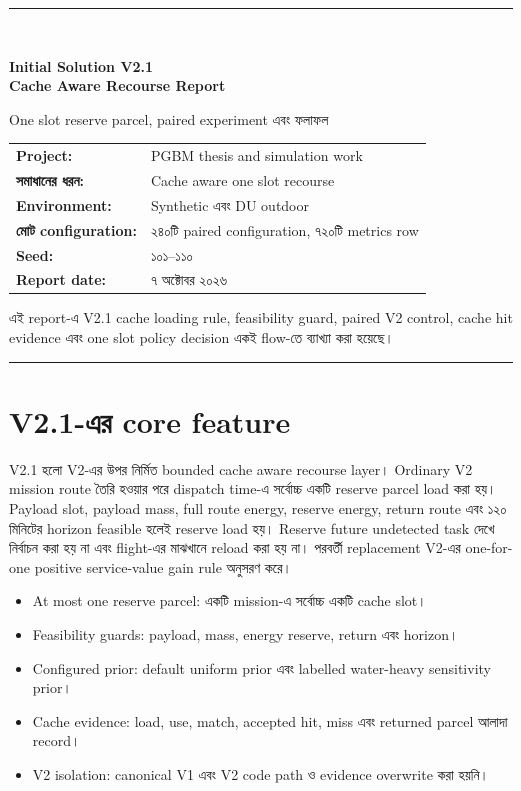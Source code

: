 \documentclass[10pt,a4paper]{article}
\begin{document}
\begin{titlepage}
\thispagestyle{empty}
\vspace*{18mm}
{\color{navy}\rule{\textwidth}{1.5pt}}\\[10mm]
{\color{navy}\englishfont\bfseries\fontsize{25}{32}\selectfont Initial Solution V2.1\\Cache Aware Recourse Report\par}
\vspace{6mm}
{\color{midgray}\sffamily\Large One slot reserve parcel, paired experiment এবং ফলাফল\par}
\vfill
\begin{tabular}{@{}ll@{}}
\textbf{Project:} & PGBM thesis and simulation work\\
\textbf{সমাধানের ধরন:} & Cache aware one slot recourse\\
\textbf{Environment:} & Synthetic এবং DU outdoor\\
\textbf{মোট configuration:} & ২৪০টি paired configuration, ৭২০টি metrics row\\
\textbf{Seed:} & ১০১--১১০\\
\textbf{Report date:} & ৭ অক্টোবর ২০২৬
\end{tabular}
\vfill
\begin{center}
\colorbox{bluegray}{\begin{minipage}{0.88\textwidth}
এই report-এ V2.1 cache loading rule, feasibility guard, paired V2 control, cache hit evidence এবং one slot policy decision একই flow-তে ব্যাখ্যা করা হয়েছে।
\end{minipage}}
\end{center}
\vspace{12mm}
{\color{navy}\rule{\textwidth}{1.5pt}}
\end{titlepage}
\tableofcontents
\clearpage
\section{V2.1-এর core feature}
V2.1 হলো V2-এর উপর নির্মিত bounded cache aware recourse layer। Ordinary V2 mission route তৈরি হওয়ার পরে dispatch time-এ সর্বোচ্চ একটি reserve parcel load করা হয়। Payload slot, payload mass, full route energy, reserve energy, return route এবং ১২০ মিনিটের horizon feasible হলেই reserve load হয়। Reserve future undetected task দেখে নির্বাচন করা হয় না এবং flight-এর মাঝখানে reload করা হয় না। পরবর্তী replacement V2-এর one-for-one positive service-value gain rule অনুসরণ করে।
\begin{itemize}
\item At most one reserve parcel: একটি mission-এ সর্বোচ্চ একটি cache slot।
\item Feasibility guards: payload, mass, energy reserve, return এবং horizon।
\item Configured prior: default uniform prior এবং labelled water-heavy sensitivity prior।
\item Cache evidence: load, use, match, accepted hit, miss এবং returned parcel আলাদা record।
\item V2 isolation: canonical V1 এবং V2 code path ও evidence overwrite করা হয়নি।
\end{itemize}
\end{document}
